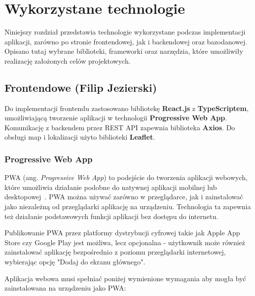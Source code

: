 \chapter{Wykorzystane technologie}
\label{chap:technology}

Niniejszy rozdział przedstawia technologie wykorzystane podczas implementacji aplikacji, zarówno po stronie frontendowej, jak i backendowej oraz bazodanowej. Opisano tutaj wybrane biblioteki, frameworki oraz narzędzia, które umożliwiły realizację założonych celów projektowych.

\section{Frontendowe (Filip Jezierski)}

Do implementacji frontendu zastosowano bibliotekę \textbf{React.js} z \textbf{TypeScriptem}, umożliwiającą tworzenie aplikacji w technologii \textbf{Progressive Web App}. Komunikację z backendem przez REST API zapewnia biblioteka \textbf{Axios}. Do obsługi map i lokalizacji użyto biblioteki \textbf{Leaflet}.

\subsection{Progressive Web App}

PWA (ang. \textit{Progressive Web App}) to podejście do tworzenia aplikacji webowych, które umożliwia działanie podobne do natywnej aplikacji mobilnej lub desktopowej~\cite{pwa-docs}. PWA można używać zarówno w przeglądarce, jak i zainstalować jako niezależną od przeglądarki aplikację na urządzeniu. Technologia ta zapewnia też działanie podstawowych funkcji aplikacji bez dostępu do internetu.

Publikowanie PWA przez platformy dystrybucji cyfrowej takie jak Apple App Store czy Google Play jest możliwa, lecz opcjonalna - użytkownik może również zainstalować aplikację bezpośrednio z poziomu przeglądarki internetowej, wybierając opcję "Dodaj do ekranu głównego".

Aplikacja webowa musi spełniać poniżej wymienione wymagania aby mogła być zainstalowana na urządzeniu jako PWA:

